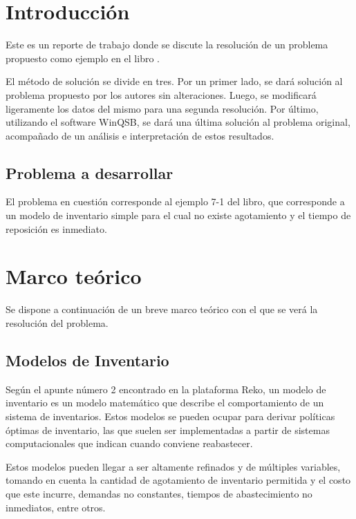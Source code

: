 \section{Introducción}
Este es un reporte de trabajo donde se discute la resolución de un problema propuesto como ejemplo en el libro \cite{acwinqsb}.

El método de solución se divide en tres. Por un primer lado, se dará solución al problema propuesto por los autores sin alteraciones. Luego, se modificará ligeramente los datos del mismo para una segunda resolución. Por último, utilizando el software WinQSB, se dará una última solución al problema original, acompañado de un análisis e interpretación de estos resultados.

\subsection{Problema a desarrollar}

El problema en cuestión corresponde al ejemplo 7-1 del libro, que corresponde a un modelo de inventario simple para el cual no existe agotamiento y el tiempo de reposición es inmediato.

\clearpage

\section{Marco teórico}
Se dispone a continuación de un breve marco teórico con el que se verá la resolución del problema.
\subsection{Modelos de Inventario}
Según el apunte número 2 encontrado en la plataforma Reko\cite{apunte}, un modelo de inventario es un modelo matemático que describe el comportamiento de un sistema de inventarios. Estos modelos se pueden ocupar para derivar políticas óptimas de inventario, las que suelen ser implementadas a partir de sistemas computacionales que indican cuando conviene reabastecer.

Estos modelos pueden llegar a ser altamente refinados y de múltiples variables, tomando en cuenta la cantidad de agotamiento de inventario permitida y el costo que este incurre, demandas no constantes, tiempos de abastecimiento no inmediatos, entre otros.

